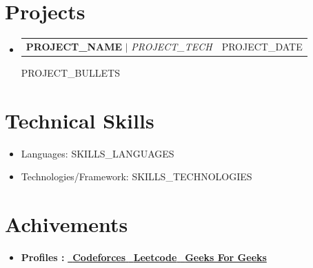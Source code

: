 \documentclass[letterpaper,11pt]{article}
\makeatletter
\newcommand{\resumeItem}[1]{
  \item\small{
    {#1 \vspace{-2pt}}
  }
}
\newcommand{\resumeProjectHeading}[2]{
    \item
    \begin{tabular*}{0.97\textwidth}{l@{\extracolsep{\fill}}r}
      \small#1 & #2 \\
    \end{tabular*}\vspace{-7pt}
}
\newcommand{\resumeSubItem}[1]{\resumeItem{#1}\vspace{-4pt}}
\newcommand{\resumeSubHeadingListStart}{\begin{itemize}[leftmargin=0.15in, label={}]}
\newcommand{\resumeSubHeadingListEnd}{\end{itemize}}
\newcommand{\resumeItemListStart}{\begin{itemize}}
\newcommand{\resumeItemListEnd}{\end{itemize}\vspace{-5pt}}
\makeatother
\begin{document}
\section{Projects}
\resumeSubHeadingListStart

\resumeProjectHeading{\textbf{{{PROJECT_NAME}}} $|$ \emph{{{PROJECT_TECH}}}}{{{PROJECT_DATE}}}

{{PROJECT_BULLETS}}

\resumeSubHeadingListEnd

\section{Technical Skills}
	\resumeSubHeadingListStart
        \resumeSubItem{Languages: {{SKILLS_LANGUAGES}}}
        \resumeSubItem{Technologies/Framework: {{SKILLS_TECHNOLOGIES}}}
        \resumeSubHeadingListEnd
\vspace{-5pt}
\vspace{-7pt}
\section{Achivements}
  \resumeSubHeadingListStart

      \resumeItemListStart
       \resumeItem{Received awards from amazon and cvent at multiple instances for outstanding performances and begin a team player}
        \resumeItem{Rated in Top 2\% of \textbf{Leetcode} in a pool of 350000 users.}
        \resumeItem{\textbf{Expert} on \textbf{Codeforces}, \textbf{Rating : 1611}}
      \resumeItemListEnd
      \vspace{-5pt}
    \resumeItem{\textbf{Profiles :}
    \href{https://codeforces.com/profile/noob_tusharb}{\ {\textbf{Codeforces }}}}{}\href{https://leetcode.com/noob_tusharb/}{\ \textbf{Leetcode} }{} \href{https://auth.geeksforgeeks.org/user/tusharextra75/practice/}{\ {\textbf{Geeks For Geeks}}} 
    \resumeSubHeadingListEnd
    \vspace{-10pt}
\end{document}
